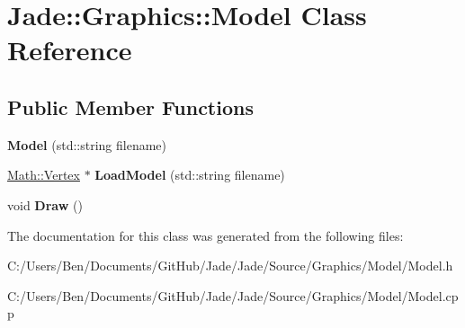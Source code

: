 \hypertarget{class_jade_1_1_graphics_1_1_model}{}\section{Jade\+:\+:Graphics\+:\+:Model Class Reference}
\label{class_jade_1_1_graphics_1_1_model}
\subsection*{Public Member Functions}
\begin{DoxyCompactItemize}
\item 
\hypertarget{class_jade_1_1_graphics_1_1_model_a5edaef1863469dc28e04be2a30a1e24c}{}{\bfseries Model} (std\+::string filename)\label{class_jade_1_1_graphics_1_1_model_a5edaef1863469dc28e04be2a30a1e24c}

\item 
\hypertarget{class_jade_1_1_graphics_1_1_model_a225fd78e3f780fe9fbd84fc18c42be3f}{}\hyperlink{struct_jade_1_1_math_1_1_vertex}{Math\+::\+Vertex} $\ast$ {\bfseries Load\+Model} (std\+::string filename)\label{class_jade_1_1_graphics_1_1_model_a225fd78e3f780fe9fbd84fc18c42be3f}

\item 
\hypertarget{class_jade_1_1_graphics_1_1_model_a1029b2a86cb0e2c075d30cba6df224ea}{}void {\bfseries Draw} ()\label{class_jade_1_1_graphics_1_1_model_a1029b2a86cb0e2c075d30cba6df224ea}

\end{DoxyCompactItemize}


The documentation for this class was generated from the following files\+:\begin{DoxyCompactItemize}
\item 
C\+:/\+Users/\+Ben/\+Documents/\+Git\+Hub/\+Jade/\+Jade/\+Source/\+Graphics/\+Model/Model.\+h\item 
C\+:/\+Users/\+Ben/\+Documents/\+Git\+Hub/\+Jade/\+Jade/\+Source/\+Graphics/\+Model/Model.\+cpp\end{DoxyCompactItemize}
